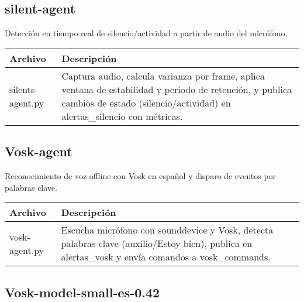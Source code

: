 \subsection*{silent-agent}

Detección en tiempo real de silencio/actividad a partir de audio del micrófono.

\begin{table}[H]
  \doublespacing
  \begin{tabularx}{\textwidth}{l X}
    \hline
    \textbf{Archivo} & \textbf{Descripción} \\
    \hline
    silents-agent.py &
    Captura audio, calcula varianza por frame, aplica ventana de estabilidad y periodo de retención, y publica cambios de estado (silencio/actividad) en alertas\_silencio con métricas.
    \\
    \hline
  \end{tabularx}
\end{table}

\subsection*{Vosk-agent}

Reconocimiento de voz offline con Vosk en español y disparo de eventos por palabras clave.

\begin{table}[H]
  \doublespacing
  \begin{tabularx}{\textwidth}{l X}
    \hline
    \textbf{Archivo} & \textbf{Descripción} \\
    \hline
    vosk-agent.py    &
    Escucha micrófono con sounddevice y Vosk, detecta palabras clave (auxilio/Estoy bien), publica en alertas\_vosk y envía comandos a vosk\_commands.
    \\
    \hline
  \end{tabularx}
\end{table}

\subsection*{Vosk-model-small-es-0.42}

